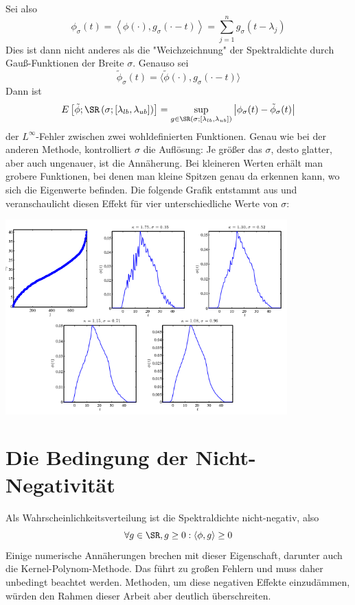 Sei also
$$\phi_{\sigma}(t) = \left \langle \phi(\cdot), g_{\sigma}(\cdot - t)\right \rangle = \sum_{j = 1}^n g_{\sigma}(t - \lambda_j)$$
Dies ist dann nicht anderes als die "Weichzeichnung" der Spektraldichte durch Gauß-Funktionen der Breite $\sigma$.
Genauso sei
$$\tilde{\phi}_{\sigma}(t) = \langle \tilde{\phi}(\cdot), g_{\sigma}(\cdot - t) \rangle$$
Dann ist
$$E\left[\tilde{\phi};\SR\left(\sigma; \left[\lambda_{lb}, \lambda_{ub} \right] \right)\right] = \sup_{g \in \SR(\sigma;[\lambda_{lb}, \lambda_{ub}])} \left| \phi_{\sigma}(t) - \tilde{\phi}_{\sigma}(t) \right|$$
der $L^\infty$-Fehler zwischen zwei wohldefinierten Funktionen.
Genau wie bei der anderen Methode, kontrolliert $\sigma$ die Auflösung:
Je größer das $\sigma$, desto glatter, aber auch ungenauer, ist die Annäherung.
Bei kleineren Werten erhält man grobere Funktionen,
bei denen man kleine Spitzen genau da erkennen kann,
wo sich die Eigenwerte befinden.
Die folgende Grafik entstammt aus \cite[p.~6]{linsaadyang14} und veranschaulicht diesen Effekt für vier unterschiedliche Werte von $\sigma$:

\includegraphics[height=7.5cm]{./Bilder/screenshot.png}

\section{Die Bedingung der Nicht-Negativität}
Als Wahrscheinlichkeitsverteilung ist die Spektraldichte nicht-negativ, also
$$\forall g \in \SR, g \geq 0: \langle \phi, g \rangle \geq 0$$
Einige numerische Annäherungen brechen mit dieser Eigenschaft, darunter auch die Kernel-Polynom-Methode.
Das führt zu großen Fehlern und muss daher unbedingt beachtet werden.
Methoden, um diese negativen Effekte einzudämmen, würden den Rahmen dieser Arbeit aber deutlich überschreiten.